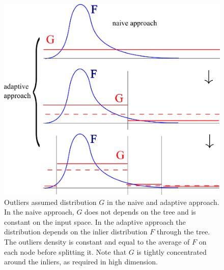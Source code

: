 \begin{figure}[!ht]
  \centering
  \includegraphics[width=0.8\linewidth]{fig_source/ocrf_fig/outlier_density.png}
  \caption{Outliers assumed distribution $G$ in the naive and adaptive approach.  In the naive approach, $G$ does not depends on the tree and is constant on the input space. In the adaptive approach the distribution depends on the inlier distribution $F$ through the tree. The outliers density is constant and equal to the average of $F$ on each node before splitting it. Note that $G$ is tightly concentrated around the inliers, as required in high dimension.
}
  \label{ocrf:fig:outlier_density}
\end{figure}

\newcommand{\pointSampled}[1]{
    \coordinate (A) at (#1);
    \draw[fill=black] (A) circle (0.03cm);
}


